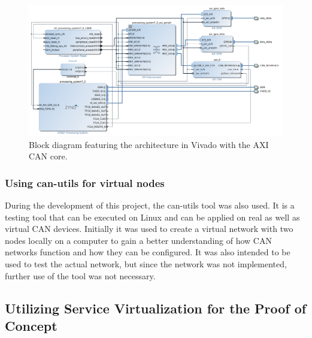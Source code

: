 \begin{figure}[h!]
	\centering
	\includegraphics[width = 1.2\linewidth]{graphics/Zybo_Arch_with_AXI_CAN.png}
	\caption{Block diagram featuring the architecture in Vivado with the AXI CAN core.}
	\label{fig:CAN_Arch_with_AXI_CAN}
\end{figure}


\subsubsection{Using can-utils for virtual nodes}

During the development of this project, the can-utils tool was also used.
It is a testing tool that can be executed on Linux and can be applied on real as well as virtual CAN devices.
Initially it was used to create a virtual network with two nodes locally on a computer to gain a better understanding of how CAN networks function and how they can be configured.
It was also intended to be used to test the actual network, but since the network was not implemented, further use of the tool was not necessary.

\subsection{Utilizing Service Virtualization for the Proof of Concept}
\label{sub:Utilizing_Svr_Virtualization}

